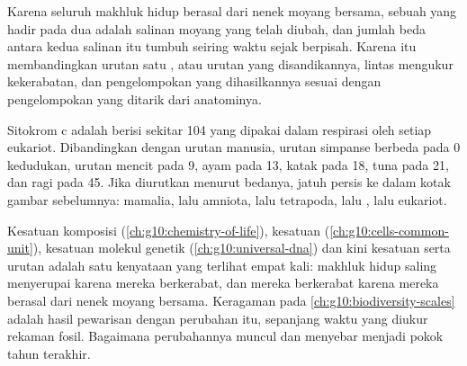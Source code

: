 \begin{proposition}\label{prop:g10:common-ancestry:molecular}
Karena seluruh makhluk hidup berasal dari nenek moyang bersama, sebuah
 yang hadir pada dua  adalah salinan  moyang yang telah
diubah, dan jumlah beda antara kedua salinan itu tumbuh seiring waktu
sejak  berpisah. Karena itu membandingkan urutan satu ,
atau urutan  yang disandikannya, lintas  mengukur
kekerabatan, dan pengelompokan yang dihasilkannya sesuai dengan
pengelompokan yang ditarik dari anatominya.
\end{proposition}
\admitted

\begin{example}[Sitokrom c]\label{ex:g10:common-ancestry:cytochrome}
Sitokrom c adalah  berisi sekitar 104  yang dipakai
dalam respirasi oleh setiap eukariot. Dibandingkan dengan urutan
manusia, urutan simpanse berbeda pada 0 kedudukan, urutan mencit pada
9, ayam pada 13, katak pada 18, tuna pada 21, dan ragi pada 45. Jika
diurutkan menurut bedanya,  jatuh persis ke dalam kotak
gambar sebelumnya: mamalia, lalu amniota, lalu tetrapoda, lalu
, lalu eukariot.
\end{example}

\begin{remark}\label{rem:g10:common-ancestry:unity}
Kesatuan komposisi (\cref{ch:g10:chemistry-of-life}), kesatuan 
(\cref{ch:g10:cells-common-unit}), kesatuan molekul genetik
(\cref{ch:g10:universal-dna}) dan kini kesatuan  serta urutan
 adalah satu kenyataan yang terlihat empat kali: makhluk hidup
saling menyerupai karena mereka berkerabat, dan mereka berkerabat
karena mereka berasal dari nenek moyang bersama. Keragaman pada
\cref{ch:g10:biodiversity-scales} adalah hasil pewarisan dengan
perubahan itu, sepanjang waktu yang diukur rekaman fosil. Bagaimana
perubahannya muncul dan menyebar menjadi pokok tahun terakhir.
\end{remark}

